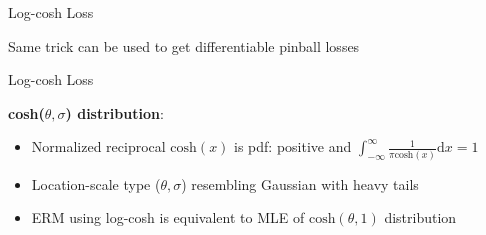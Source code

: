 \documentclass[11pt,compress,t,notes=noshow, xcolor=table]{beamer}
\begin{document}
\begin{frame}{Log-cosh Loss }

\vfill
{}
{}

\vfill

Same trick can be used to get differentiable pinball losses

\end{frame}

\begin{frame}{Log-cosh Loss }

\textbf{cosh($\theta,\sigma$) distribution}:\\

\begin{itemize}

\item Normalized reciprocal $\text{cosh}(x)$ is pdf: 
positive and $\int_{-\infty}^{\infty} \frac{1}{\pi \text{cosh}(x)} \text{d}x = 1$

\item Location-scale type ($\theta, \sigma$) 
resembling Gaussian with heavy tails

\item ERM using log-cosh 
is equivalent to MLE of $\text{cosh}(\theta,1)$ distribution

\end{itemize}

\vfill

{}


\end{frame}
\end{document}
